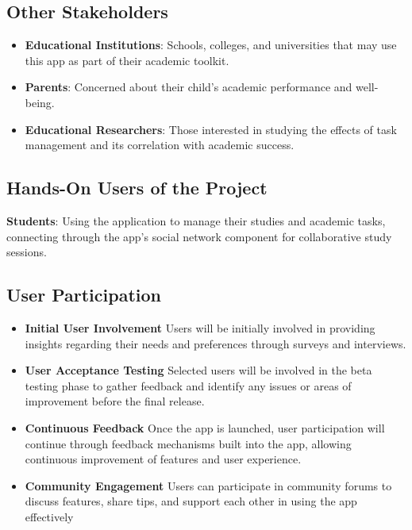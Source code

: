 \documentclass[12pt]{article}
\begin{document}
\subsection{Other Stakeholders}
\begin{itemize}
  \item \textbf{Educational Institutions}: Schools, colleges, and universities that may use this app as part of their academic toolkit.
  \item \textbf{Parents}: Concerned about their child's academic performance and well-being.
  \item \textbf{Educational Researchers}: Those interested in studying the effects of task management and its correlation with academic success.
\end{itemize}

\subsection{Hands-On Users of the Project}
\textbf{Students}: Using the application to manage their studies and academic tasks, connecting through the app's social network component for collaborative study sessions.
\subsection{User Participation}
\begin{itemize}
  \item \textbf{Initial User Involvement}
  Users will be initially involved in providing insights regarding their needs and preferences through surveys and interviews. 
  \item \textbf{User Acceptance Testing}
  Selected users will be involved in the beta testing phase to gather feedback and identify any issues or areas of improvement before the final release.
  \item \textbf{Continuous Feedback}
  Once the app is launched, user participation will continue through feedback mechanisms built into the app, allowing continuous improvement of features and user experience.
  \item \textbf{Community Engagement}
  Users can participate in community forums to discuss features, share tips, and support each other in using the app effectively
\end{itemize}
\end{document}

